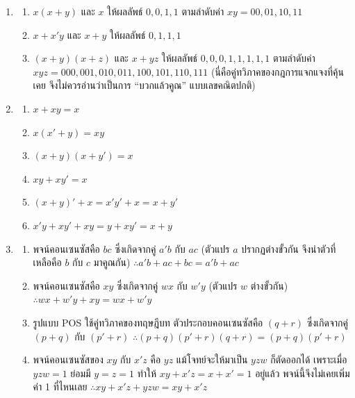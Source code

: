 \begin{enumerate}[resume*=anskey]
    \item
    \begin{enumerate}[label=\textbf{\thechapter.\arabic{enumi}.\arabic*}]
        \item $x(x+y)$ และ $x$ ให้ผลลัพธ์ $0,0,1,1$ ตามลำดับค่า $xy=00,01,10,11$
        \item $x+x'y$ และ $x+y$ ให้ผลลัพธ์ $0,1,1,1$
        \item $(x+y)(x+z)$ และ $x+yz$ ให้ผลลัพธ์ $0,0,0,1,1,1,1,1$ ตามลำดับค่า $xyz=000,001,010,011,100,101,110,111$ (นี่คือคู่ทวิภาคของกฎการแจกแจงที่คุ้นเคย จึงไม่ควรอ่านว่าเป็นการ ``บวกแล้วคูณ'' แบบเลขคณิตปกติ)
    \end{enumerate}

    \item
    \begin{enumerate}[label=\textbf{\thechapter.\arabic{enumi}.\arabic*}]
        \item $x+xy=x$
        \item $x(x'+y)=xy$
        \item $(x+y)(x+y')=x$
        \item $xy+xy'=x$
        \item $(x+y)'+x=x'y'+x=x+y'$
        \item $x'y+xy'+xy=y+xy'=x+y$
    \end{enumerate}

    \item
    \begin{enumerate}[label=\textbf{\thechapter.\arabic{enumi}.\arabic*}]
        \item พจน์คอนเซนซัสคือ $bc$ ซึ่งเกิดจากคู่ $a'b$ กับ $ac$ (ตัวแปร $a$ ปรากฏต่างขั้วกัน จึงนำตัวที่เหลือคือ $b$ กับ $c$ มาคูณกัน) $\therefore a'b+ac+bc=a'b+ac$
        \item พจน์คอนเซนซัสคือ $xy$ ซึ่งเกิดจากคู่ $wx$ กับ $w'y$ (ตัวแปร $w$ ต่างขั้วกัน) $\therefore wx+w'y+xy=wx+w'y$
        \item รูปแบบ POS ใช้คู่ทวิภาคของทฤษฎีบท ตัวประกอบคอนเซนซัสคือ $(q+r)$ ซึ่งเกิดจากคู่ $(p+q)$ กับ $(p'+r)$ $\therefore (p+q)(p'+r)(q+r)=(p+q)(p'+r)$
        \item พจน์คอนเซนซัสของ $xy$ กับ $x'z$ คือ $yz$ แม้โจทย์จะให้มาเป็น $yzw$ ก็ตัดออกได้ เพราะเมื่อ $yzw=1$ ย่อมมี $y=z=1$ ทำให้ $xy+x'z=x+x'=1$ อยู่แล้ว พจน์นี้จึงไม่เคยเพิ่มค่า 1 ที่ไหนเลย $\therefore xy+x'z+yzw=xy+x'z$
    \end{enumerate}
\end{enumerate}

